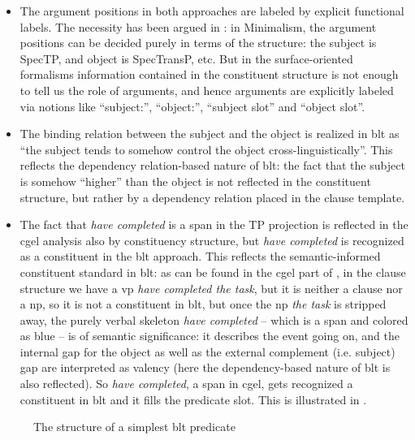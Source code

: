 \documentclass[UTF8, a4paper, oneside, scheme=plain]{ctexart}
\newcommand*{\corpus}[1]{\emph{#1}}
\begin{document}
\begin{itemize}
    \item The argument positions in both approaches are labeled by explicit functional labels.
    The necessity has been argued in :
    in Minimalism, the argument positions can be decided purely in terms of the structure:
    the subject is SpecTP, and object is SpecTransP, etc.
    But in the surface-oriented formalisms 
    information contained in the constituent structure
    is not enough to tell us the role of arguments,
    and hence arguments are explicitly labeled via notions like 
    ``subject:'', ``object:'', ``subject slot'' and ``object slot''.
    \item The binding relation between the subject and the object 
    is realized in \ac{blt} as ``the subject tends to somehow control the object cross-linguistically''.
    This reflects the dependency relation-based nature of \ac{blt}:
    the fact that the subject is somehow ``higher'' than the object 
    is not reflected in the constituent structure, 
    but rather by a dependency relation placed in the clause template.
    \item The fact that \corpus{have completed} is a span in the TP projection 
    is reflected in the \ac{cgel} analysis also by constituency structure,
    but \corpus{have completed} is recognized as a constituent in the \ac{blt} approach.
    This reflects the semantic-informed constituent standard in \ac{blt}:
    as can be found in the \ac{cgel} part of ,
    in the clause structure we have a \ac{vp} \corpus{have completed the task},
    but it is neither a clause nor a \ac{np},
    so it is not a constituent in \ac{blt},
    but once the \ac{np} \corpus{the task} is stripped away,
    the purely verbal skeleton \corpus{have completed} -- which is a span and colored as blue --
    is of semantic significance: 
    it describes the event going on, 
    and the internal gap for the object as well as the external complement (i.e. subject) gap 
    are interpreted as valency (here the dependency-based nature of \ac{blt} is also reflected).
    So \corpus{have completed}, a span in \ac{cgel}, gets recognized a constituent in \ac{blt} 
    and it fills the predicate slot.
    This is illustrated in .
\end{itemize}

\begin{figure}
    \centering
    
    \caption{The structure of a simplest \ac{blt} predicate}
    \label{fig:blt-predicate-simple}
\end{figure}
\end{document}
